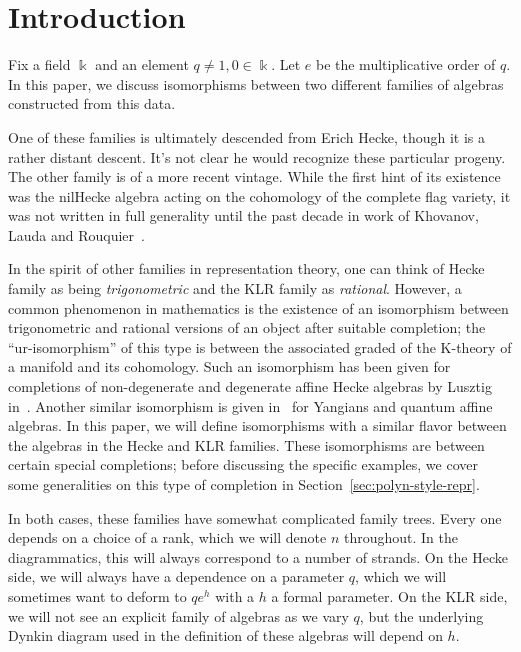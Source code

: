 \documentclass[ALCO,ThmDefs,Unicode,epreuves]{cedram}
\newcommand{\K}{\Bbbk}%
\begin{document}
\maketitle
\section{Introduction}
\label{sec:introduction}


Fix a field $\K$ and an element $q\neq 1,0\in \K$. Let
$e$ be the multiplicative order of $q$. In this paper, we
discuss isomorphisms between two different families of algebras
constructed from this data.

One of these families is
ultimately descended from Erich Hecke, though it is a rather distant
descent. It's not clear he would recognize these particular progeny.
The other family is of a more recent vintage. While the first hint of
its existence was the nilHecke algebra acting on the cohomology of the
complete flag variety, it was not written in full generality until the
past decade in work of Khovanov, Lauda and Rouquier~\cite{KLI,KLII,Rou2KM}. 

In the spirit of
other families in representation theory, one can think of Hecke family
as being \emph{trigonometric} and the KLR family as \emph{rational}. However, a common phenomenon
in mathematics is the existence of an isomorphism between
trigonometric and rational versions of an object after suitable completion; the
``ur-isomorphism'' of this type is between the associated graded of
the K-theory of a manifold and its cohomology. Such an isomorphism
has been given for completions of non-degenerate and degenerate affine
Hecke algebras by Lusztig in~\cite{Lusgraded}. Another similar
isomorphism is given in~\cite{GTL} for Yangians and quantum affine
algebras. In this paper, we will define isomorphisms with a similar
flavor between the algebras in the Hecke and KLR families. These
isomorphisms are between certain special completions; before
discussing the specific examples, we cover some generalities on this
type of completion in Section~\ref{sec:polyn-style-repr}.

In both cases, these families have somewhat complicated family
trees. Every one depends on a choice of a rank, which we will denote $n$
throughout. In the diagrammatics, this will always correspond to a
number of strands. On the Hecke side, we will always have a dependence
on a parameter $q$, which we will sometimes want to deform to $qe^h$
with a $h$ a formal parameter. On the KLR side, we will not see an
explicit family of algebras as we vary $q$, but the underlying
Dynkin diagram used in the definition of these algebras will depend on $h$. 
\end{document}
